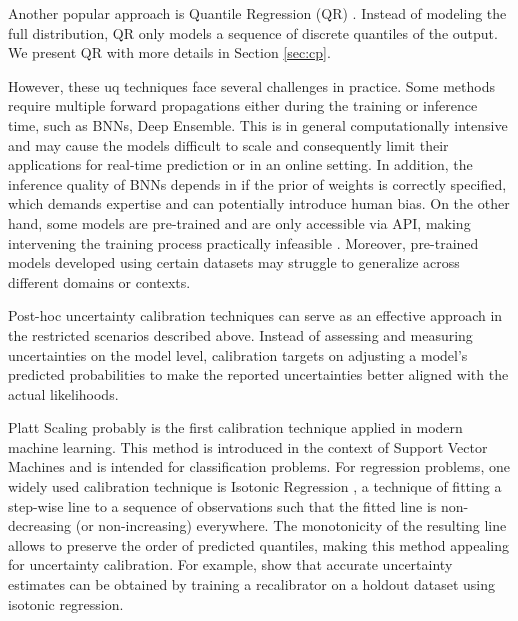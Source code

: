 Another popular approach is Quantile Regression (QR) \cite{koenker1978regression}. Instead of modeling the full distribution, QR only models a sequence of discrete quantiles of the output. We present QR with more details in Section \ref{sec:cp}. 

However, these \gls{uq} techniques face several challenges in practice. Some methods require multiple forward propagations either during the training or inference time, such as BNNs, Deep Ensemble. This is in general computationally intensive and may cause the models difficult to scale and consequently limit their applications for real-time prediction or in an online setting. In addition, the inference quality of BNNs depends in if the prior of weights is correctly specified, which demands expertise and can potentially introduce human bias. On the other hand, some models are pre-trained and are only accessible via API, making intervening the training process practically infeasible \cite{mossina2024CVPR}. Moreover, pre-trained models developed using certain datasets may struggle to generalize across different domains or contexts. 

\vspace{0.3cm}
Post-hoc uncertainty calibration techniques can serve as an effective approach in the restricted scenarios described above. Instead of assessing and measuring uncertainties on the model level, calibration targets on adjusting a model's predicted probabilities to make the reported uncertainties better aligned with the actual likelihoods.

Platt Scaling \cite{platt1999probabilistic} probably is the first calibration technique applied in modern machine learning. This method is introduced in the context of Support Vector Machines and is intended for classification problems. For regression problems, one widely used calibration technique is Isotonic Regression \cite{niculescumizil2005predicting}, a technique of fitting a step-wise line to a sequence of observations such that the fitted line is non-decreasing (or non-increasing) everywhere. The monotonicity of the resulting line allows to preserve the order of predicted quantiles, making this method appealing for uncertainty calibration. For example, \cite{pmlr-v80-kuleshov18a} show that accurate uncertainty estimates can be obtained by training a recalibrator on a holdout dataset using isotonic regression.

